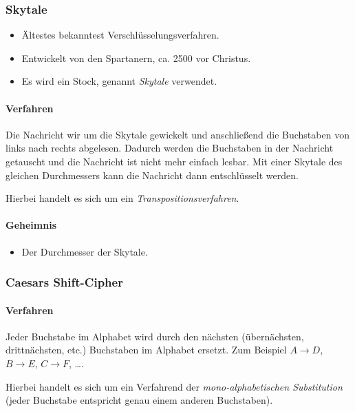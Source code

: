 			\subsubsection{Skytale} %
				\begin{itemize}
					\item Ältestes bekanntest Verschlüsselungsverfahren.
					\item Entwickelt von den Spartanern, ca. 2500 vor Christus.
					\item Es wird ein Stock, genannt \textit{Skytale} verwendet.
				\end{itemize}

				\paragraph{Verfahren}
					Die Nachricht wir um die Skytale gewickelt und anschließend die Buchstaben von links nach rechts abgelesen. Dadurch werden die Buchstaben in der Nachricht getauscht und die Nachricht ist nicht mehr einfach lesbar. Mit einer Skytale des gleichen Durchmessers kann die Nachricht dann entschlüsselt werden.

					Hierbei handelt es sich um ein \textit{Transpositionsverfahren}.

				\paragraph{Geheimnis}
					\begin{itemize}
						\item Der Durchmesser der Skytale.
					\end{itemize}

			\subsubsection{Caesars Shift-Cipher}
				\paragraph{Verfahren}
					Jeder Buchstabe im Alphabet wird durch den nächsten (übernächsten, drittnächsten, etc.) Buchstaben im Alphabet ersetzt. Zum Beispiel \( A \rightarrow D \), \( B \rightarrow E \), \( C \rightarrow F \), \dots.

					Hierbei handelt es sich um ein Verfahrend der \textit{mono-alphabetischen Substitution} (jeder Buchstabe entspricht genau einem anderen Buchstaben).

